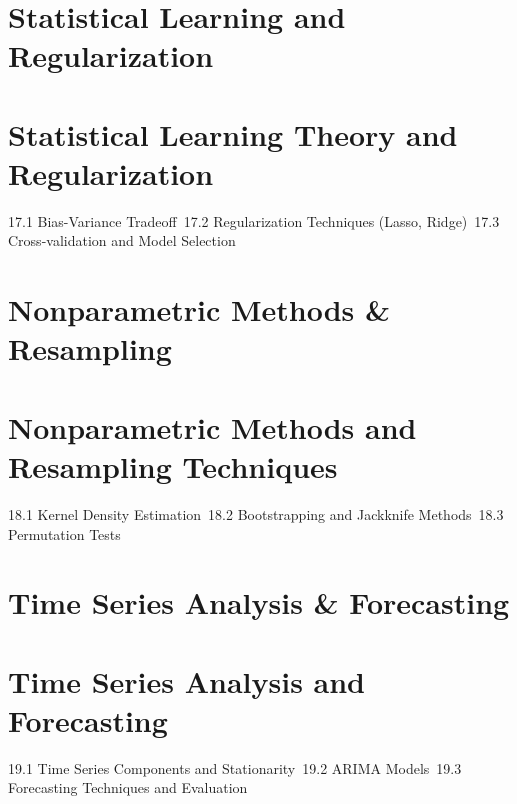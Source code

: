 \section{Statistical Learning and Regularization}
\section{Statistical Learning Theory and Regularization}
17.1 Bias-Variance Tradeoff\
17.2 Regularization Techniques (Lasso, Ridge)\
17.3 Cross-validation and Model Selection\
\section{Nonparametric Methods \& Resampling}
\section{Nonparametric Methods and Resampling Techniques}
18.1 Kernel Density Estimation\
18.2 Bootstrapping and Jackknife Methods\
18.3 Permutation Tests\
\section{Time Series Analysis \& Forecasting}
\section{Time Series Analysis and Forecasting}
19.1 Time Series Components and Stationarity\
19.2 ARIMA Models\
19.3 Forecasting Techniques and Evaluation\
